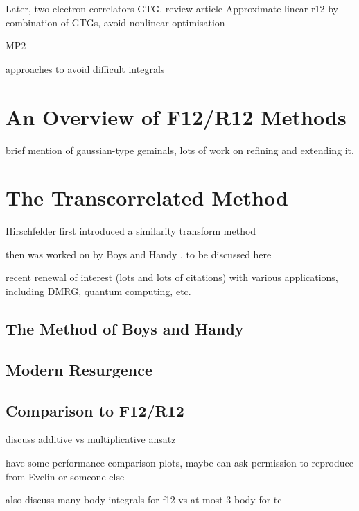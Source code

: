 Later, two-electron correlators \gls{GTG}. review article \cite{mitroyTheory2013} Approximate linear r12 by combination of GTGs, avoid nonlinear optimisation \cite{bukowskiNew1994,perssonAccurate1996}

MP2\cite{panGaussian1970,panElectron1972}

approaches to avoid difficult integrals\cite{szalewiczNew1982,szalewiczAtomic1983,wenzelAtomic1986,szalewiczAtomic1984,tewWeak2007}

\section{An Overview of F12/R12 Methods}

brief mention of gaussian-type geminals\cite{boysIntegral1960,singerUse1960}, lots of work on refining and extending it.\cite{lesterGaussian1964,mitroyTheory2013,bukowskiNew1994,perssonAccurate1996,panGaussian1970,panElectron1972,szalewiczNew1982,szalewiczAtomic1983,wenzelAtomic1986}


\section{The Transcorrelated Method}
\label{sec:tc}

Hirschfelder first introduced a similarity transform method \cite{hirschfelderRemoval1963}

then was worked on by Boys and Handy , to be discussed here

recent renewal of interest (lots and lots of citations) with various applications, including DMRG, quantum computing, etc.


\subsection{The Method of Boys and Handy}

\subsection{Modern Resurgence}

\subsection{Comparison to F12/R12}

discuss additive vs multiplicative ansatz

have some performance comparison plots, maybe can ask permission to reproduce from Evelin or someone else

also discuss many-body integrals for f12 vs at most 3-body for tc
